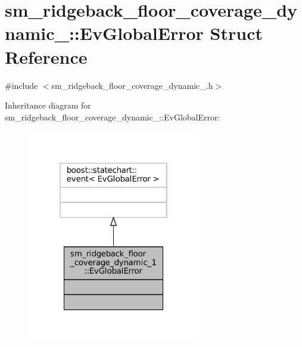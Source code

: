 \hypertarget{structsm__ridgeback__floor__coverage__dynamic__1_1_1EvGlobalError}{}\section{sm\+\_\+ridgeback\+\_\+floor\+\_\+coverage\+\_\+dynamic\+\_\+:\+:Ev\+Global\+Error Struct Reference}
\label{structsm__ridgeback__floor__coverage__dynamic__1_1_1EvGlobalError}


{\ttfamily \#include $<$sm\+\_\+ridgeback\+\_\+floor\+\_\+coverage\+\_\+dynamic\+\_.\+h$>$}



Inheritance diagram for sm\+\_\+ridgeback\+\_\+floor\+\_\+coverage\+\_\+dynamic\+\_\+:\+:Ev\+Global\+Error\+:
\nopagebreak
\begin{figure}[H]
\begin{center}
\leavevmode
\includegraphics[width=214pt]{structsm__ridgeback__floor__coverage__dynamic__1_1_1EvGlobalError__inherit__graph}
\end{center}
\end{figure}


